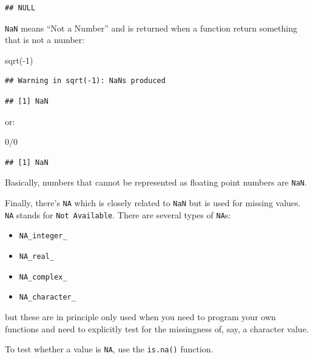 \documentclass[
]{article}
\newenvironment{Shaded}{\begin{snugshade}}{\end{snugshade}}
\newcommand{\DecValTok}[1]{\textcolor[rgb]{0.00,0.00,0.81}{#1}}
\newcommand{\FunctionTok}[1]{\textcolor[rgb]{0.00,0.00,0.00}{#1}}
\newcommand{\NormalTok}[1]{#1}
\newcommand{\SpecialCharTok}[1]{\textcolor[rgb]{0.00,0.00,0.00}{#1}}
\providecommand{\tightlist}{%
  \setlength{\itemsep}{0pt}\setlength{\parskip}{0pt}}
\begin{document}
\begin{verbatim}
## NULL
\end{verbatim}

\texttt{NaN} means ``Not a Number'' and is returned when a function return something that is not a number:

\begin{Shaded}
\begin{Highlighting}[]
\FunctionTok{sqrt}\NormalTok{(}\SpecialCharTok{{-}}\DecValTok{1}\NormalTok{)}
\end{Highlighting}
\end{Shaded}

\begin{verbatim}
## Warning in sqrt(-1): NaNs produced
\end{verbatim}

\begin{verbatim}
## [1] NaN
\end{verbatim}

or:

\begin{Shaded}
\begin{Highlighting}[]
\DecValTok{0}\SpecialCharTok{/}\DecValTok{0}
\end{Highlighting}
\end{Shaded}

\begin{verbatim}
## [1] NaN
\end{verbatim}

Basically, numbers that cannot be represented as floating point numbers are \texttt{NaN}.

Finally, there's \texttt{NA} which is closely related to \texttt{NaN} but is used for missing values. \texttt{NA} stands for \texttt{Not\ Available}. There are
several types of \texttt{NA}s:

\begin{itemize}
\tightlist
\item
  \texttt{NA\_integer\_}
\item
  \texttt{NA\_real\_}
\item
  \texttt{NA\_complex\_}
\item
  \texttt{NA\_character\_}
\end{itemize}

but these are in principle only used when you need to program your own functions and need
to explicitly test for the missingness of, say, a character value.

To test whether a value is \texttt{NA}, use the \texttt{is.na()} function.
\end{document}
